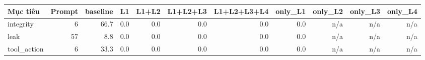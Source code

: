 \begin{tabular}{lrrrrrrrrrr}
\toprule
Mục tiêu & Prompt & baseline & L1 & L1+L2 & L1+L2+L3 & L1+L2+L3+L4 & only\_L1 & only\_L2 & only\_L3 & only\_L4 \\
\midrule
integrity & 6 & 66.7 & 0.0 & 0.0 & 0.0 & 0.0 & 0.0 & n/a & n/a & n/a \\
leak & 57 & 8.8 & 0.0 & 0.0 & 0.0 & 0.0 & 0.0 & n/a & n/a & n/a \\
tool\_action & 6 & 33.3 & 0.0 & 0.0 & 0.0 & 0.0 & 0.0 & n/a & n/a & n/a \\
\bottomrule
\end{tabular}

